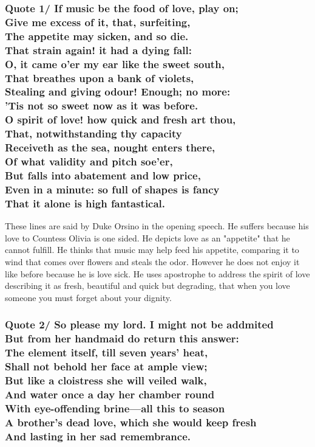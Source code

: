 \documentclass[12pt, a4paper]{article}
\begin{document}
\subsubsection*{Quote 1/
  If music be the food of love, play on;\\
	Give me excess of it, that, surfeiting,\\
	The appetite may sicken, and so die.\\
	That strain again! it had a dying fall:\\
	O, it came o'er my ear like the sweet south,\\
	That breathes upon a bank of violets,\\
	Stealing and giving odour! Enough; no more:\\
	'Tis not so sweet now as it was before.\\
	O spirit of love! how quick and fresh art thou,\\
	That, notwithstanding thy capacity	\\
	Receiveth as the sea, nought enters there,\\
	Of what validity and pitch soe'er,\\
	But falls into abatement and low price,\\
	Even in a minute: so full of shapes is fancy\\
	That it alone is high fantastical.
}

These lines are said by Duke Orsino  in the opening speech. He suffers because
his love to Countess Olivia is one sided. He depicts love as an "appetite" that
he cannot fulfill. He thinks that music may help feed his appetite, comparing
it to wind that comes over flowers and steals the odor. However he does not
enjoy it like before because he is love sick. He uses apostrophe to address the spirit of love
describing it as fresh, beautiful and quick but degrading, that when you
love someone you must forget about your dignity.

\restoregeometry

\subsubsection*{Quote 2/ 
  So please my lord. I might not be addmited\\ 
  But from her handmaid do return this answer:\\
  The element itself, till seven years' heat, \\
  Shall not behold her face at ample view;\\ 
  But like a cloistress she will veiled walk,\\ 
  And water once a day her chamber round \\ 
  With eye-offending brine---all this to season\\
  A brother's dead love, which she would keep fresh\\
  And lasting in her sad remembrance.
}
\end{document}
